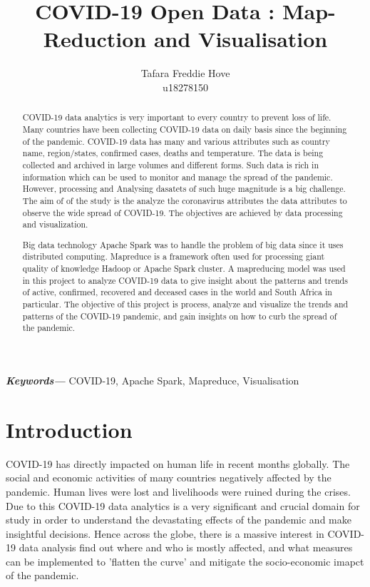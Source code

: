 \documentclass[12pt,letterpaper, twoside]{article}
\title{COVID-19 Open Data : Map-Reduction and Visualisation}
\author{Tafara Freddie Hove \\
        \small u18278150 \\
}
\date{}
\providecommand{\keywords}[1]
{
  \small	
  \textbf{\textit{Keywords---}} #1 
}
\begin{document}
\maketitle

\begin{abstract}
COVID-19 data analytics is very important to every country to prevent loss of life. Many countries have been collecting COVID-19 data  on daily basis since the beginning of the pandemic. COVID-19 data has many and various attributes such as country name, region/states, confirmed cases, deaths and temperature. The data is being collected and archived in large volumes and different forms. Such data is rich in information which can be used to monitor and manage the spread of the pandemic. However, processing and Analysing dasatets of such huge magnitude is a big challenge. The aim of of the study is the analyze the coronavirus attributes the data attributes to observe the wide spread of COVID-19. The objectives are achieved by data processing and visualization. 

Big data technology Apache Spark was to handle the problem of big data since it uses distributed computing. Mapreduce is a framework often used for processing giant quality of knowledge Hadoop or Apache Spark cluster. A mapreducing model was used in this project to analyze COVID-19 data to give insight about the patterns and trends of active, confirmed, recovered and deceased cases in the world and South Africa in particular. The objective of this project is process, analyze and visualize the trends and patterns of the COVID-19 pandemic, and gain insights on how to curb the spread of the pandemic.

\end{abstract}\hspace{10pt}
\keywords{COVID-19, Apache Spark, Mapreduce, Visualisation}

\section{Introduction}
COVID-19 has directly impacted on human life in recent months globally. The social and economic activities of many countries negatively affected by the pandemic. Human lives were lost and livelihoods were ruined during the crises.  Due to this COVID-19 data analytics is a very significant and crucial domain for study in order to understand the devastating effects of the pandemic and make insightful decisions. Hence across the globe, there is a massive interest in COVID-19 data analysis find out where and who is mostly affected, and what measures can be implemented to 'flatten the curve' and mitigate the socio-economic imapct of the pandemic. 
\end{document}
